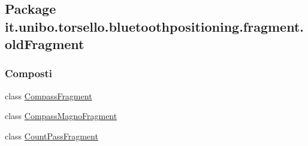 \hypertarget{namespaceit_1_1unibo_1_1torsello_1_1bluetoothpositioning_1_1fragment_1_1oldFragment}{}\subsection{Package it.\+unibo.\+torsello.\+bluetoothpositioning.\+fragment.\+old\+Fragment}
\label{namespaceit_1_1unibo_1_1torsello_1_1bluetoothpositioning_1_1fragment_1_1oldFragment}
\subsubsection*{Composti}
\begin{DoxyCompactItemize}
\item 
class \hyperlink{classit_1_1unibo_1_1torsello_1_1bluetoothpositioning_1_1fragment_1_1oldFragment_1_1CompassFragment}{Compass\+Fragment}
\item 
class \hyperlink{classit_1_1unibo_1_1torsello_1_1bluetoothpositioning_1_1fragment_1_1oldFragment_1_1CompassMagnoFragment}{Compass\+Magno\+Fragment}
\item 
class \hyperlink{classit_1_1unibo_1_1torsello_1_1bluetoothpositioning_1_1fragment_1_1oldFragment_1_1CountPassFragment}{Count\+Pass\+Fragment}
\end{DoxyCompactItemize}
